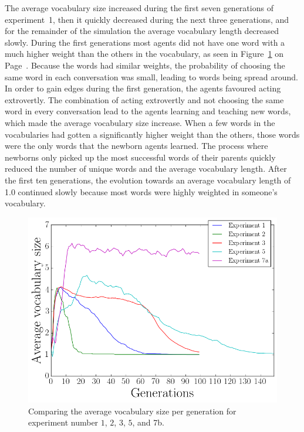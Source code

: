 The average vocabulary size increased during the first seven generations of experiment~1, then it quickly decreased during the next three generations, and for the remainder of the simulation the average vocabulary length decreased slowly. During the first generations most agents did not have one word with a much higher weight than the others in the vocabulary, as seen in Figure~\ref{fig:VocComp} on Page~\pageref{fig:VocComp}. Because the words had similar weights, the probability of choosing the same word in each conversation was small, leading to words being spread around. In order to gain edges during the first generation, the agents favoured acting extrovertly. The combination of acting extrovertly and not choosing the same word in every conversation lead to the agents learning and teaching new words, which made the average vocabulary size increase. When a few words in the vocabularies had gotten a significantly higher weight than the others, those words were the only words that the newborn agents learned. The process where newborns only picked up the most successful words of their parents quickly reduced the number of unique words and the average vocabulary length. After the first ten generations, the evolution towards an average vocabulary length of 1.0 continued slowly because most words were highly weighted in someone's vocabulary.

\begin{figure}
    \centering
    \includegraphics[width=0.7\linewidth]{fig/Discussion/VocabularyComparison}
    \caption{Comparing the average vocabulary size per generation for experiment number $1$, $2$, $3$, $5$, and 7b.}
    \label{fig:VocComp}
\end{figure}
 
